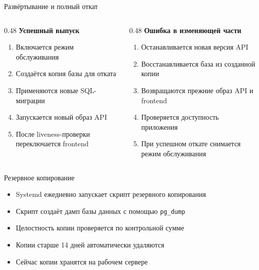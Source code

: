 \documentclass[aspectratio=169]{beamer}
\begin{document}
\begin{frame}{Развёртывание и полный откат}
  \begin{columns}[T,onlytextwidth]
    \begin{column}{0.48\textwidth}
      \textbf{Успешный выпуск}
      \begin{enumerate}
        \item Включается режим обслуживания
        \item Создаётся копия базы для отката
        \item Применяются новые SQL-миграции
        \item Запускается новый образ API
        \item После liveness-проверки переключается frontend
      \end{enumerate}
    \end{column}
    \begin{column}{0.48\textwidth}
      \textbf{Ошибка в изменяющей части}
      \begin{enumerate}
        \item Останавливается новая версия API
        \item Восстанавливается база из созданной копии
        \item Возвращаются прежние образ API и frontend
        \item Проверяется доступность приложения
        \item При успешном откате снимается режим обслуживания
      \end{enumerate}
    \end{column}
  \end{columns}
\end{frame}

\begin{frame}{Резервное копирование}
  \begin{itemize}
    \item Systemd ежедневно запускает скрипт резервного копирования
    \item Скрипт создаёт дамп базы данных с помощью \texttt{pg\_dump}
    \item Целостность копии проверяется по контрольной сумме
    \item Копии старше 14 дней автоматически удаляются
    \item Сейчас копии хранятся на рабочем сервере
  \end{itemize}
\end{frame}
\end{document}
